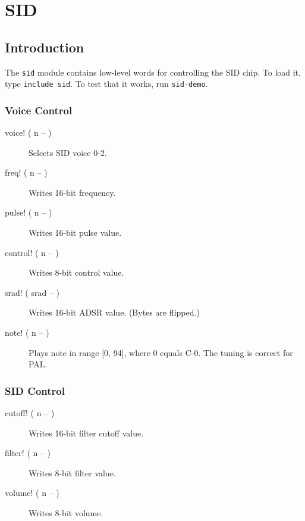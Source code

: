 \chapter{SID}

\section{Introduction}

The \texttt{sid} module contains low-level words for controlling the SID chip. To load it, type \texttt{include sid}. To test that it works, run \texttt{sid-demo}.

\subsection{Voice Control}

\begin{description}
    \item[voice! ( n -- )] Selects SID voice 0-2.
    \item[freq! ( n -- )] Writes 16-bit frequency.
    \item[pulse! ( n -- )] Writes 16-bit pulse value.
    \item[control! ( n -- )] Writes 8-bit control value.
    \item[srad! ( srad -- )] Writes 16-bit ADSR value. (Bytes are flipped.)
    \item[note! ( n -- )] Plays note in range [0, 94], where 0 equals C-0. The tuning is correct for PAL.
\end{description}

\subsection{SID Control}

\begin{description}
    \item[cutoff! ( n -- )] Writes 16-bit filter cutoff value.
    \item[filter! ( n -- )] Writes 8-bit filter value.
    \item[volume! ( n -- )] Writes 8-bit volume.
\end{description}
